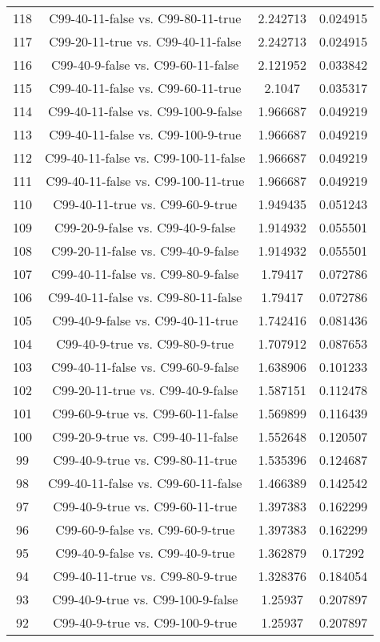 \documentclass[a4paper,10pt]{article}
\begin{document}
\begin{landscape}
\begin{table}[!htp]
\begin{tabular}{cccc}
118&C99-40-11-false vs. C99-80-11-true&2.242713&0.024915\\
117&C99-20-11-true vs. C99-40-11-false&2.242713&0.024915\\
116&C99-40-9-false vs. C99-60-11-false&2.121952&0.033842\\
115&C99-40-11-false vs. C99-60-11-true&2.1047&0.035317\\
114&C99-40-11-false vs. C99-100-9-false&1.966687&0.049219\\
113&C99-40-11-false vs. C99-100-9-true&1.966687&0.049219\\
112&C99-40-11-false vs. C99-100-11-false&1.966687&0.049219\\
111&C99-40-11-false vs. C99-100-11-true&1.966687&0.049219\\
110&C99-40-11-true vs. C99-60-9-true&1.949435&0.051243\\
109&C99-20-9-false vs. C99-40-9-false&1.914932&0.055501\\
108&C99-20-11-false vs. C99-40-9-false&1.914932&0.055501\\
107&C99-40-11-false vs. C99-80-9-false&1.79417&0.072786\\
106&C99-40-11-false vs. C99-80-11-false&1.79417&0.072786\\
105&C99-40-9-false vs. C99-40-11-true&1.742416&0.081436\\
104&C99-40-9-true vs. C99-80-9-true&1.707912&0.087653\\
103&C99-40-11-false vs. C99-60-9-false&1.638906&0.101233\\
102&C99-20-11-true vs. C99-40-9-false&1.587151&0.112478\\
101&C99-60-9-true vs. C99-60-11-false&1.569899&0.116439\\
100&C99-20-9-true vs. C99-40-11-false&1.552648&0.120507\\
99&C99-40-9-true vs. C99-80-11-true&1.535396&0.124687\\
98&C99-40-11-false vs. C99-60-11-false&1.466389&0.142542\\
97&C99-40-9-true vs. C99-60-11-true&1.397383&0.162299\\
96&C99-60-9-false vs. C99-60-9-true&1.397383&0.162299\\
95&C99-40-9-false vs. C99-40-9-true&1.362879&0.17292\\
94&C99-40-11-true vs. C99-80-9-true&1.328376&0.184054\\
93&C99-40-9-true vs. C99-100-9-false&1.25937&0.207897\\
92&C99-40-9-true vs. C99-100-9-true&1.25937&0.207897\\

\end{tabular}
\end{table}
\end{landscape}
\end{document}
